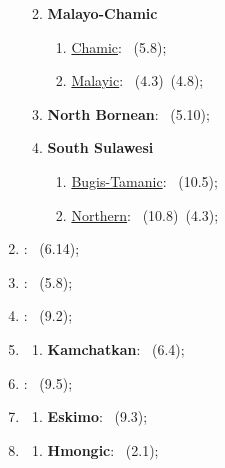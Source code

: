 \begin{enumerate}
\begin{enumerate}
\begin{enumerate}
\begin{enumerate}
            \end{enumerate}
        \end{enumerate}
        \item \textbf{Malayo-Chamic}
        \begin{enumerate}
            \item \uline{Chamic}: \langnameAcehnese\ (5.8);
            \item \uline{Malayic}: \langnameIndonesian\ (4.3)\EnumComma\langnameMinangkabau\ (4.8);
        \end{enumerate}
        \item \textbf{North Bornean}: \langnamePalauan\ (5.10);
        \item \textbf{South Sulawesi}
        \begin{enumerate}
            \item \uline{Bugis-Tamanic}: \langnameEmbaloh\ (10.5);
            \item \uline{Northern}: \langnameAralle\ (10.8)\EnumComma\langnameMandar\ (4.3);
        \end{enumerate}
    \end{enumerate}
    \item \MakeUppercase{\textbf{\langfamily{\famNBougainville}}}: \langnameRotokas\ (6.14);
    \item \MakeUppercase{\textbf{\langfamily{\famSBougainville}}}: \langnameNasioi\ (5.8);
    \item \MakeUppercase{\textbf{\langfamily{\famChocoan}}}: \langnameChami\ (9.2);
    \item \MakeUppercase{\textbf{\langfamily{\famChukotkoKamtchatkan}}}
    \begin{enumerate}
        \item \textbf{Kamchatkan}: \langnameItelmen\ (6.4);
    \end{enumerate}
    \item \MakeUppercase{\textbf{\langfamily{\famEngan}}}: \langnameHuli\ (9.5);
    \item \MakeUppercase{\textbf{\langfamily{\famEskimoAleut}}}
    \begin{enumerate}
        \item \textbf{Eskimo}: \langnameYupik\ (9.3);
    \end{enumerate}
    \item \MakeUppercase{\textbf{\langfamily{\famHmongMen}}}
    \begin{enumerate}
        \item \textbf{Hmongic}: \langnameHmong\ (2.1);

\end{enumerate}
\end{enumerate}
